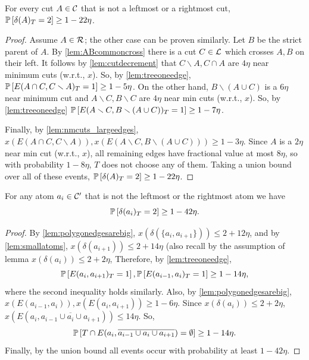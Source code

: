 \begin{lemma}\label{lem:Astrictpeven}
For every cut $A\in {\cal C}$ that is not a leftmost or a rightmost cut, $\P{\delta(A)_T=2} \geq 1-22\eta$.
\end{lemma}
\begin{proof}
Assume $A\in \cR$; the other case can be proven similarly. 
Let $B$ be the strict parent of $A$. By \cref{lem:ABcommoncross} there is a cut $C\in{\cal L}$ which crosses $A,B$ on their left. It follows by \cref{lem:cutdecrement} that $C \smallsetminus A, C\cap A$ are $4\eta$ near minimum cuts (w.r.t., $x$). So, by \cref{lem:treeoneedge}, $\P{E(A\cap C, C\smallsetminus A)_T=1}\geq 1-5\eta$. 
On the other hand, $B\smallsetminus (A\cup C)$ is a $6\eta$ near minimum cut and $A\smallsetminus C, B\smallsetminus C$ are $4\eta$ near min cuts (w.r.t., $x$). So, by \cref{lem:treeoneedge} $\P{E(A\smallsetminus C, B\smallsetminus (A\cup C))_T=1}\geq 1-7\eta$.

Finally,  by  \cref{lem:nmcuts_largeedges}, $x(E(A\cap C, C\smallsetminus A)), x(E(A\smallsetminus C, B\smallsetminus (A\cup C))) \geq 1-3\eta$. Since $A$ is a $2\eta$ near min cut (w.r.t., $x$), all remaining edges have fractional value at most $8\eta$, so with probability $1-8\eta$, $T$ does not choose any of them. Taking a union bound over all of these events, $\P{\delta(A)_T=2}\geq 1-22\eta$.
\end{proof}

\begin{lemma}\label{lem:atoms-even-whp}
	For any atom $a_i\in {\cal C}'$ that is not the leftmost or the rightmost atom we have
	$$\P{\delta(a_i)_T = 2} \ge 1-42\eta.$$
\end{lemma}
\begin{proof}
	By \cref{lem:polygonedgesarebig}, $x(\delta(\{a_i,a_{i+1}\}))\leq 2+12\eta$, 
	and by \cref{lem:smallatoms}, $x(\delta(a_{i+1}))\leq 2+14\eta$ (also recall by the assumption of lemma $x(\delta(a_i))\leq 2+2\eta$,
	 Therefore, by \cref{lem:treeoneedge}, 
	 $$\P{E(a_{i},a_{i+1})_T=1},\P{E(a_{i-1},a_i)_T=1}\geq 1-14\eta,$$
	 where the second inequality holds similarly.
Also, by \cref{lem:polygonedgesarebig}, $x(E(a_{i-1},a_{i})),x(E(a_{i},a_{i+1}))	 \geq 1-6\eta$.
Since $x(\delta(a_i))\leq 2+2\eta$, $x(E(a_i, \overline{a_{i-1}\cup a_i\cup a_{i+1}}))\leq 14\eta$.
So, 
$$\P{T\cap E(a_i, \overline{a_{i-1}\cup a_i\cup a_{i+1}})=\emptyset}\geq 1-14\eta.$$
Finally,  by the union bound all events occur with probability at least $1-42\eta$. 
\end{proof}


